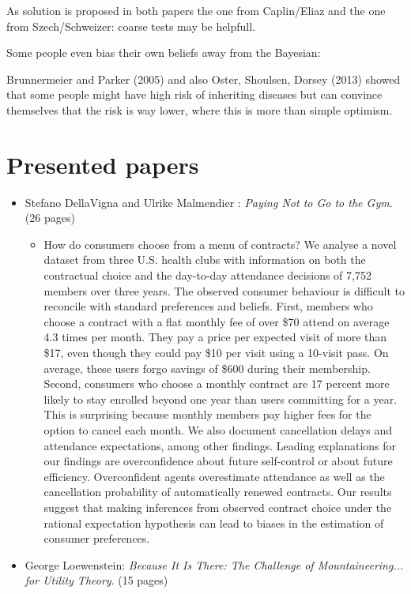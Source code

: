 As solution is proposed in both papers the one from Caplin/Eliaz and the one from Szech/Schweizer: coarse tests may be helpfull.
~\newline

Some people even bias their own beliefs away from the Bayesian:
 
Brunnermeier and Parker (2005) and also Oster, Shoulsen, Dorsey (2013) showed that some people might have high risk of inheriting diseases but can convince themselves that the risk is way lower, where this is more than simple optimism.

\section{Presented papers}

\begin{itemize}
	\item Stefano DellaVigna and Ulrike Malmendier : \textit{Paying Not to Go to the Gym}. (26 pages)
		\begin{itemize}
			\item How do consumers choose from a menu of contracts? We analyse a novel dataset from three U.S. health clubs with information on both the contractual choice and the day-to-day attendance decisions of 7,752 members over three years. The observed consumer behaviour is difficult to reconcile with standard preferences and beliefs. First, members who choose a contract with a flat monthly fee of over \$70 attend on average 4.3 times per month. They pay a price per expected visit of more than \$17, even though they could pay \$10 per visit using a 10-visit pass. On average, these users forgo savings of \$600 during their membership. Second, consumers who choose a monthly contract are 17 percent more likely to stay enrolled beyond one year than users committing for a year. This is surprising because monthly members pay higher fees for the option to cancel each month. We also document cancellation delays and attendance expectations, among other findings. Leading explanations for our findings are overconfidence about future self-control or about future efficiency. Overconfident agents overestimate attendance as well as the cancellation probability of automatically renewed contracts. Our results suggest that making inferences from observed contract choice under the rational expectation hypothesis can lead to biases in the estimation of consumer preferences.
		\end{itemize}
	\item George Loewenstein: \textit{Because It Is There: The Challenge of Mountaineering... for Utility Theory}. (15 pages)

\end{itemize}
